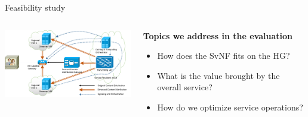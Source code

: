 \documentclass[a4paper]{beamer}
\begin{document}
\begin{frame}{Feasibility study}
	\begin{columns}[T]
		\begin{column}[T]{0.55 \textwidth} 
			\vspace{1em}
			\includegraphics[width=18em]{highleveldesign7.png}
		\end{column}
										
		\begin{column}[T]{0.35\textwidth} 
										   
			\textbf{Topics we address in the evaluation}
			\begin{itemize}
				\item How does the SvNF fits on the HG?
				\item What is the value brought by the overall service?
				\item How do we optimize service operations?
			\end{itemize}
		\end{column}
																										
	\end{columns}
								
\end{frame}
\end{document}
